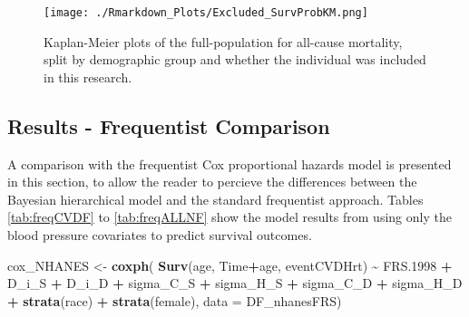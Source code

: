 \documentclass[
]{article}
\newenvironment{Shaded}{\begin{snugshade}}{\end{snugshade}}
\newcommand{\AttributeTok}[1]{\textcolor[rgb]{0.13,0.29,0.53}{#1}}
\newcommand{\FloatTok}[1]{\textcolor[rgb]{0.00,0.00,0.81}{#1}}
\newcommand{\FunctionTok}[1]{\textcolor[rgb]{0.13,0.29,0.53}{\textbf{#1}}}
\newcommand{\NormalTok}[1]{#1}
\newcommand{\OtherTok}[1]{\textcolor[rgb]{0.56,0.35,0.01}{#1}}
\newcommand{\SpecialCharTok}[1]{\textcolor[rgb]{0.81,0.36,0.00}{\textbf{#1}}}
\begin{document}
\begin{figure}
\centering
\texttt{[image: ./Rmarkdown\_Plots/Excluded\_SurvProbKM.png]}
\caption{Kaplan-Meier plots of the full-population for all-cause mortality, split by demographic group and whether the individual was included in this research.}\label{fig:excpop}
\end{figure}

\subsection{Results - Frequentist Comparison}\label{results---frequentist-comparison}

A comparison with the frequentist Cox proportional hazards model is presented in this section, to allow the reader to percieve the differences between the Bayesian hierarchical model and the standard frequentist approach. Tables \ref{tab:freqCVDF} to \ref{tab:freqALLNF} show the model results from using only the blood pressure covariates to predict survival outcomes.

\begin{Shaded}
\begin{Highlighting}[]
\NormalTok{cox\_NHANES }\OtherTok{\textless{}{-}} \FunctionTok{coxph}\NormalTok{( }\FunctionTok{Surv}\NormalTok{(age, Time}\SpecialCharTok{+}\NormalTok{age, eventCVDHrt) }\SpecialCharTok{\textasciitilde{}}\NormalTok{ FRS}\FloatTok{.1998} \SpecialCharTok{+}
\NormalTok{                     D\_i\_S }\SpecialCharTok{+}\NormalTok{ D\_i\_D }\SpecialCharTok{+}\NormalTok{ sigma\_C\_S }\SpecialCharTok{+}\NormalTok{ sigma\_H\_S }\SpecialCharTok{+}
\NormalTok{                     sigma\_C\_D }\SpecialCharTok{+}\NormalTok{ sigma\_H\_D }\SpecialCharTok{+} \FunctionTok{strata}\NormalTok{(race) }\SpecialCharTok{+} \FunctionTok{strata}\NormalTok{(female), }\AttributeTok{data =}\NormalTok{ DF\_nhanesFRS)}
\end{Highlighting}
\end{Shaded}
\end{document}

